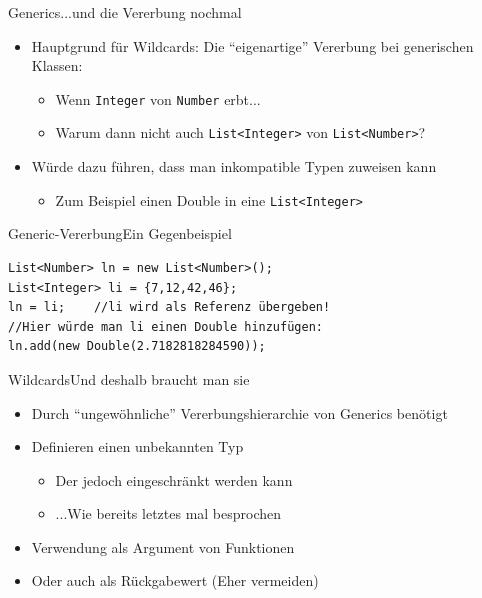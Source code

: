 \begin{frame}{Generics}{...und die Vererbung nochmal}
    \begin{itemize}
        \item Hauptgrund für Wildcards: Die "`eigenartige"' Vererbung bei generischen Klassen:
        \begin{itemize}
            \item Wenn \texttt{Integer} von \texttt{Number} erbt...
            \item Warum dann nicht auch \texttt{List<Integer>} von \texttt{List<Number>}?
        \end{itemize}
        \item Würde dazu führen, dass man inkompatible Typen zuweisen kann
        \begin{itemize}
            \item Zum Beispiel einen Double in eine \texttt{List<Integer>}
        \end{itemize}
    \end{itemize}
\end{frame}

\begin{frame}[fragile]{Generic-Vererbung}{Ein Gegenbeispiel}
\lstset{style=java}
\begin{lstlisting}
List<Number> ln = new List<Number>();
List<Integer> li = {7,12,42,46};
ln = li;    //li wird als Referenz übergeben!
//Hier würde man li einen Double hinzufügen:
ln.add(new Double(2.7182818284590));
\end{lstlisting}
\end{frame}

\begin{frame}{Wildcards}{Und deshalb braucht man sie}
    \begin{itemize}
        \item Durch "`ungewöhnliche"' Vererbungshierarchie von Generics benötigt
        \item Definieren einen unbekannten Typ
        \begin{itemize}
            \item Der jedoch eingeschränkt werden kann
            \item ...Wie bereits letztes mal besprochen
        \end{itemize}
        \item Verwendung als Argument von Funktionen
        \item Oder auch als Rückgabewert (Eher vermeiden)
    \end{itemize}
\end{frame}

